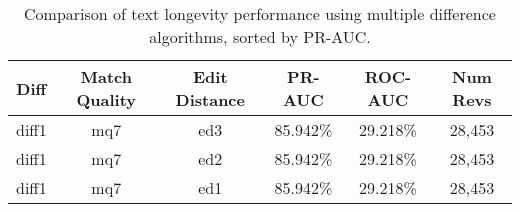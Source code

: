 \begin{table}[tbph]
\begin{center}
\begin{tabular}{|c|c|c||c|c|c|}
\hline
Diff & Match Quality & Edit Distance & PR-AUC & ROC-AUC & Num Revs \\
\hline
\hline
diff1 & mq7 & ed3 & 85.942\% & 29.218\% & 28,453 \\
diff1 & mq7 & ed2 & 85.942\% & 29.218\% & 28,453 \\
diff1 & mq7 & ed1 & 85.942\% & 29.218\% & 28,453 \\
\hline
\end{tabular}
\end{center}
\caption{Comparison of text longevity performance using
    multiple difference algorithms, sorted by PR-AUC.}
\label{tab:textshoutK}
\end{table}
